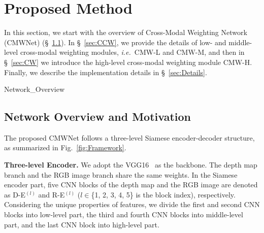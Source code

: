 \documentclass[runningheads]{llncs}
\newcommand{\ie}{\emph{i.e.}}
\begin{document}
\section{Proposed Method}
\label{sec:OurMethod}

In this section, we start with the overview of Cross-Modal
Weighting Network (CMWNet) (\S~\ref{sec:Overview}).
In \S~\ref{sec:CCW}, we provide the details of low- and middle-level cross-modal
weighting modules, \ie~CMW-L and CMW-M, and then in \S~\ref{sec:CW} we introduce the high-level cross-modal
weighting module CMW-H.
Finally, we describe the implementation details in \S~\ref{sec:Details}.



\begin{figure*}[t!]
	\centering
	\begin{overpic}[width=\textwidth]{Network_Overview}
    \end{overpic}
\caption{\small \textbf{Illustration of the proposed CMWNet.}	
	For both RGB and depth channel, the Siamese encoder network is employed to extract feature blocks organized in three levels.
	Three Cross-Modal Weighting (CMW) modules, CMW-L, CMW-M and CMW-H, are proposed to capture the interactions at corresponding level, and provide inputs for the decoder. The decoder progressively aggregates all the cross-modal cross-scale information for the final prediction.
	For training, multi-scale pixel-level supervision for intermediate predictions are utilized.
    }
\label{fig:Framework}
\end{figure*}




\subsection{Network Overview and Motivation}
\label{sec:Overview}

The proposed CMWNet follows a three-level Siamese encoder-decoder structure, as summarized in Fig.~\ref{fig:Framework}.


\noindent\textbf{Three-level Encoder.}
We adopt the VGG16~\cite{2014VGG16ICLR} as the backbone.
The depth map branch and the RGB image branch share the same weights.
In the Siamese encoder part,
five CNN blocks of the depth map and the RGB image are
denoted as D-E$^{(l)}$ and R-E$^{(l)}$ ($\mathit{l}\in$\{1, 2, 3, 4, 5\}
is the block index), respectively.
Considering the unique properties of features, we divide the first
and second CNN blocks into low-level part, the third and fourth CNN blocks
into middle-level part, and the last CNN block into high-level part.
\end{document}
